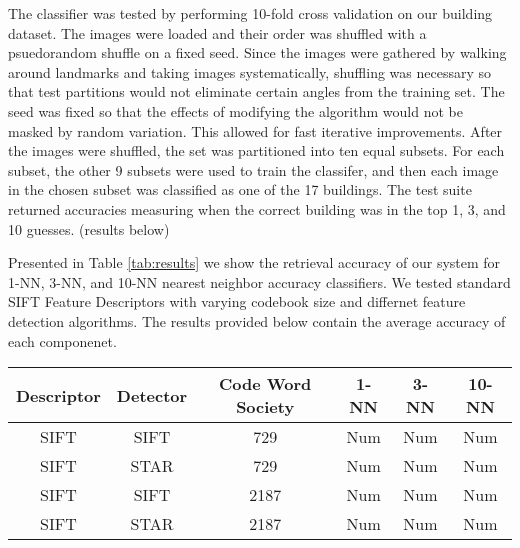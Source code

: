 The classifier was tested by performing 10-fold cross validation on our building dataset. 
The images were loaded and their order was shuffled with a psuedorandom shuffle on a fixed seed. 
Since the images were gathered by walking around landmarks and taking images systematically, shuffling was necessary so that test partitions would not eliminate certain angles from the training set. 
The seed was fixed so that the effects of modifying the algorithm would not be masked by random variation. This allowed for fast iterative improvements. After the images were shuffled, the set was partitioned into ten equal subsets. 
For each subset, the other 9 subsets were used to train the classifer, and then  each image in the chosen subset was classified as one of the 17 buildings. 
The test suite returned accuracies measuring when the correct building was in the top 1, 3, and 10 guesses. (results below)


Presented in Table \ref{tab:results} we show the retrieval accuracy of our system for 1-NN, 3-NN, and 10-NN nearest neighbor accuracy classifiers.
We tested standard SIFT Feature Descriptors with varying codebook size and differnet feature detection algorithms.
The results provided below contain the average accuracy of each componenet.

\begin{figure*}[ht!]
\label{tab:results}
\centering
\begin{tabular}{| c | c | c | c | c | c |}
\hline
Descriptor & Detector & Code Word Society & 1-NN & 3-NN & 10-NN\\ \hline
SIFT & SIFT & 729 & Num & Num & Num \\ \hline
SIFT & STAR & 729 & Num & Num & Num \\ \hline
SIFT & SIFT & 2187 & Num & Num & Num \\ \hline
SIFT & STAR & 2187 & Num & Num & Num\\ \hline
\end{tabular}
\vspace*{10pt}
\caption{Retrieval Accuracy}
\end{figure*}